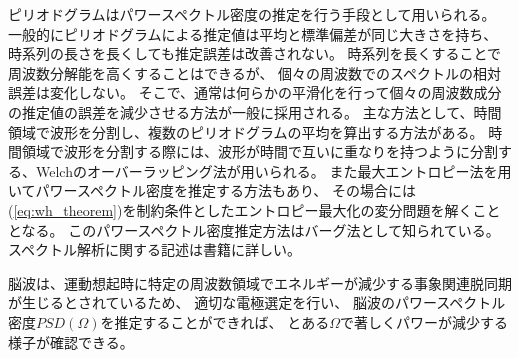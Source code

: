 ピリオドグラムはパワースペクトル密度の推定を行う手段として用いられる。
一般的にピリオドグラムによる推定値は平均と標準偏差が同じ大きさを持ち、
時系列の長さを長くしても推定誤差は改善されない。
時系列を長くすることで周波数分解能を高くすることはできるが、
個々の周波数でのスペクトルの相対誤差は変化しない。
そこで、通常は何らかの平滑化を行って個々の周波数成分の推定値の誤差を減少させる方法が一般に採用される。
主な方法として、時間領域で波形を分割し、複数のピリオドグラムの平均を算出する方法がある。
時間領域で波形を分割する際には、波形が時間で互いに重なりを持つように分割する、Welchのオーバーラッピング法が用いられる。
また最大エントロピー法を用いてパワースペクトル密度を推定する方法もあり、
その場合には(\ref{eq:wh_theorem})を制約条件としたエントロピー最大化の変分問題を解くこととなる。
このパワースペクトル密度推定方法はバーグ法として知られている。
スペクトル解析に関する記述は書籍\cite{スペクトル解析}に詳しい。

脳波は、運動想起時に特定の周波数領域でエネルギーが減少する事象関連脱同期が生じるとされているため、
適切な電極選定を行い、
脳波のパワースペクトル密度\(PSD(\Omega)\)を推定することができれば、
とある\(\Omega\)で著しくパワーが減少する様子が確認できる。